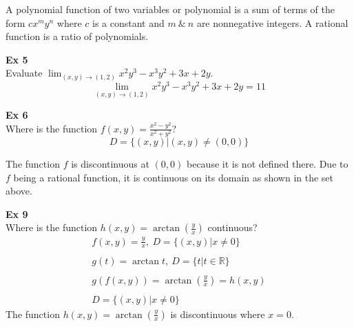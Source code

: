 \documentclass{article}
\begin{document}
 A polynomial function of two variables or polynomial is a sum of terms of the form $ cx^{m}y^{n} $ where $ c $ is a constant and $ m ~\&~ n $ are nonnegative integers. A rational function is a ratio of polynomials.

 \textbf{Ex 5}\\
 Evaluate $ \lim_{(x,y) \to (1,2)} x^{2}y^{3}-x^{3}y^{2}+3x+2y $.
 \[
   \boxed{\lim_{(x,y) \to (1,2)} x^{2}y^{3}-x^{3}y^{2}+3x+2y=11}
 \]

 \textbf{Ex 6}\\
 Where is the function $ f(x,y)=\frac{x^{2}-y^{2}}{x^{2}+y^{2}} $?
 \[
   D=\{ (x,y)|(x,y)\neq (0,0) \}
 \]

 The function $ f $ is discontinuous at $ (0,0) $ because it is not defined there. Due to $ f $ being a rational function, it is continuous on its domain as shown in the set above.

 \textbf{Ex 9}\\
 Where is the function $ h(x,y) = \arctan{(\frac{y}{x})} $ continuous?
 \[
   \begin{gathered}
   f(x,y)=\frac{y}{x},~D=\{ (x,y)| x\neq 0 \}\\
   ~\\
   g(t)=\arctan t,~D=\{ t|t \in \mathbb{R} \}\\
   ~\\
   g(f(x,y))=\arctan{(\frac{y}{x})}=h(x,y)\\
   ~\\
   \boxed{D=\{ (x,y) | x \neq 0 \}} 
   \end{gathered}
 \]
 The function $ h(x,y)=\arctan{(\frac{y}{x} )} $ is discontinuous where $ x=0 $. 
 
\end{document}
